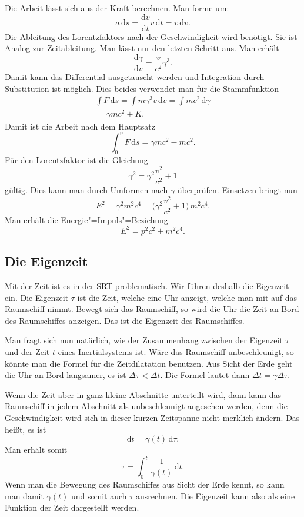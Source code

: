 \documentclass[a4paper,11pt,fleqn,twocolumn,twoside]{scrartcl}
\begin{document}
Die Arbeit lässt sich aus der Kraft berechnen. Man forme um:%
\[a\,\mathrm ds = \frac{\mathrm dv}{\mathrm dt} v\,\mathrm dt
= v\,\mathrm dv.\]
Die Ableitung des Lorentzfaktors nach der Geschwindigkeit wird
benötigt. Sie ist Analog zur Zeitableitung. Man lässt nur den letzten
Schritt aus. Man erhält%
\[\frac{\mathrm d\gamma}{\mathrm dv} = \frac{v}{c^2} \gamma^3.\]
Damit kann das Differential ausgetauscht werden und Integration durch
Substitution ist möglich. Dies beides verwendet man für die
Stammfunktion%
\begin{gather*}
\int F\,\mathrm ds = \int m\gamma^3 v\,\mathrm dv
= \int mc^2\,\mathrm d\gamma\\
= \gamma mc^2 + K.
\end{gather*}
Damit ist die Arbeit nach dem Hauptsatz%
\[\int_0^v F\,\mathrm ds = \gamma mc^2 - mc^2.\]
Für den Lorentzfaktor ist die Gleichung%
\[\gamma^2=\gamma^2\frac{v^2}{c^2}+1\]
gültig. Dies kann man durch Umformen nach $\gamma$ überprüfen.
Einsetzen bringt nun%
\[E^2 = \gamma^2m^2c^4
= \Big(\gamma^2\frac{v^2}{c^2}+1\Big)\,m^2c^4.\]
Man erhält die Energie"=Impuls"=Beziehung%
\[E^2 = p^2c^2+m^2c^4.\]


\subsection{Die Eigenzeit}

Mit der Zeit ist es in der SRT problematisch. Wir führen deshalb die
Eigenzeit ein. Die Eigenzeit $\tau$ ist die Zeit, welche eine Uhr
anzeigt, welche man mit auf das Raumschiff nimmt. Bewegt sich das
Raumschiff, so wird die Uhr die Zeit an Bord des Raumschiffes
anzeigen. Das ist die Eigenzeit des Raumschiffes.

Man fragt sich nun natürlich, wie der Zusammenhang zwischen der
Eigenzeit $\tau$ und der Zeit $t$ eines Inertialsystems ist.
Wäre das Raumschiff unbeschleunigt, so könnte man die Formel für die
Zeitdilatation benutzen. Aus Sicht der Erde geht die Uhr an Bord
langsamer, es ist
$\Delta\tau<\Delta t$.
Die Formel lautet dann $\Delta t = \gamma\Delta\tau.$

Wenn die Zeit aber in ganz kleine Abschnitte unterteilt wird,
dann kann das Raumschiff in jedem Abschnitt als unbeschleunigt
angesehen werden, denn die Geschwindigkeit wird sich in dieser
kurzen Zeitspanne nicht merklich ändern. Das heißt, es ist%
\[\mathrm dt = \gamma(t)\,\mathrm d\tau.\]
Man erhält somit
\[\tau = \int_0^t \frac{1}{\gamma(t)}\,\mathrm dt.\]
Wenn man die Bewegung des Raumschiffes aus Sicht der Erde kennt,
so kann man damit $\gamma(t)$ und somit auch $\tau$ ausrechnen.
Die Eigenzeit kann also als eine Funktion der Zeit dargestellt werden.
\end{document}
